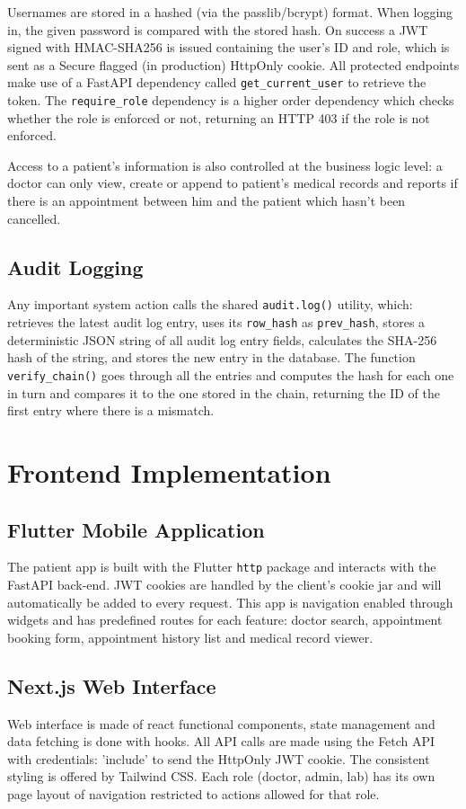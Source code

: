 \documentclass[a4paper,12pt]{report}
\begin{document}
Usernames are stored in a hashed (via the passlib/bcrypt) format. When logging in, the given password is compared with the stored hash. On success a JWT signed with HMAC-SHA256 is issued containing the user's ID and role, which is sent as a Secure flagged (in production) HttpOnly cookie. All protected endpoints make use of a FastAPI dependency called \texttt{get\_current\_user} to retrieve the token. The \texttt{require\_role} dependency is a higher order dependency which checks whether the role is enforced or not, returning an HTTP 403 if the role is not enforced.

Access to a patient's information is also controlled at the business logic level: a doctor can only view, create or append to patient's medical records and reports if there is an appointment between him and the patient which hasn't been cancelled.

\subsection{Audit Logging}

Any important system action calls the shared \texttt{audit.log()} utility, which: retrieves the latest audit log entry, uses its \texttt{row\_hash} as \texttt{prev\_hash}, stores a deterministic JSON string of all audit log entry fields, calculates the SHA-256 hash of the string, and stores the new entry in the database. The function \texttt{verify\_chain()} goes through all the entries and computes the hash for each one in turn and compares it to the one stored in the chain, returning the ID of the first entry where there is a mismatch.

\section{Frontend Implementation}

\subsection{Flutter Mobile Application}
The patient app is built with the Flutter \texttt{http} package and interacts with the FastAPI back-end. JWT cookies are handled by the client's cookie jar and will automatically be added to every request. This app is navigation enabled through widgets and has predefined routes for each feature: doctor search, appointment booking form, appointment history list and medical record viewer.

\subsection{Next.js Web Interface}
Web interface is made of react functional components, state management and data fetching is done with hooks. All API calls are made using the Fetch API with credentials: 'include' to send the HttpOnly JWT cookie. The consistent styling is offered by Tailwind CSS. Each role (doctor, admin, lab) has its own page layout of navigation restricted to actions allowed for that role.
\end{document}
